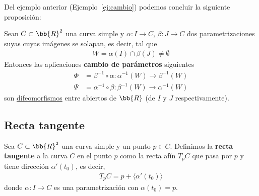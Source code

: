 

Del ejemplo anterior (Ejemplo~\ref{ej:cambio}) podemos concluir la siguiente proposición:\\
\begin{prop}\label{prop:cambio}
    Sean $C\subset \bb{R}^2$ una curva simple y $\alpha:I \to C$, $\beta: J \to C$ dos parametrizaciones suyas cuyas imágenes se solapan, es decir, tal que 
    \begin{gather*}
        W = \alpha(I)\cap \beta(J) \neq \emptyset
    \end{gather*}
    Entonces las aplicaciones \textbf{cambio de parámetros} siguientes
    \begin{align*}
        \Phi &= \beta^{-1}\circ \alpha : \alpha^{-1}(W) \to \beta^{-1}(W)\\
        \Psi &= \alpha^{-1}\circ \beta : \beta^{-1}(W) \to \alpha^{-1}(W)
    \end{align*}
    son \underline{difeomorfismos} entre abiertos de $\bb{R}$ (de $I$ y $J$ respectivamente).
\end{prop}

\subsection{Recta tangente}

\begin{definicion}
    Sea $C\subset \bb{R}^2$ una curva simple y un punto $p\in C$. Definimos la \textbf{recta tangente} a la curva $C$ en el punto $p$ como la recta afín $T_pC$ que pasa por $p$ y tiene dirección $\alpha'(t_0)$, es decir,
    \begin{gather*}
        T_pC = p + \langle \alpha'(t_0) \rangle
    \end{gather*}
    donde $\alpha: I \to C$ es una parametrización con $\alpha(t_0)=p$.
\end{definicion}

